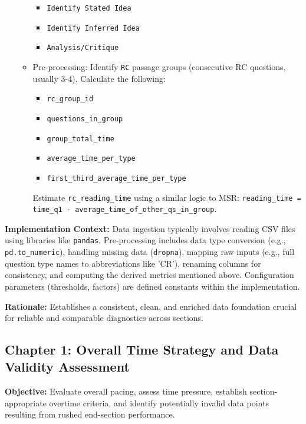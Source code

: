 \documentclass{article}
\begin{document}
\begin{itemize}
\begin{itemize}
\begin{itemize}
                \item \texttt{Identify Stated Idea}
                \item \texttt{Identify Inferred Idea}
                \item \texttt{Analysis/Critique}
            \end{itemize}
        \item Pre-processing: Identify \texttt{RC} passage groups (consecutive RC questions, usually 3-4). Calculate the following:
            \begin{itemize}
                \item \texttt{rc\_group\_id}
                \item \texttt{questions\_in\_group}
                \item \texttt{group\_total\_time}
                \item \texttt{average\_time\_per\_type}
                \item \texttt{first\_third\_average\_time\_per\_type}
            \end{itemize}
            Estimate \texttt{rc\_reading\_time} using a similar logic to MSR:
            \texttt{reading\_time = time\_q1 - average\_time\_of\_other\_qs\_in\_group}.
    \end{itemize}
\end{itemize}

\textbf{Implementation Context:} Data ingestion typically involves reading CSV files using libraries like \texttt{pandas}. Pre-processing includes data type conversion (e.g., \texttt{pd.to\_numeric}), handling missing data (\texttt{dropna}), mapping raw inputs (e.g., full question type names to abbreviations like 'CR'), renaming columns for consistency, and computing the derived metrics mentioned above. Configuration parameters (thresholds, factors) are defined constants within the implementation.

\textbf{Rationale:} Establishes a consistent, clean, and enriched data foundation crucial for reliable and comparable diagnostics across sections.

\subsection{Chapter 1: Overall Time Strategy and Data Validity Assessment}

\textbf{Objective:} Evaluate overall pacing, assess time pressure, establish section-appropriate overtime criteria, and identify potentially invalid data points resulting from rushed end-section performance.
\end{document}
